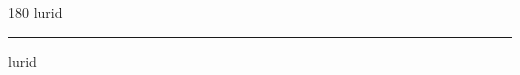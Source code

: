 
\begin{frame}
\begin{center}
\begin{turn}{180}
{\fontsize{2.5cm}{1em}\selectfont lurid}
\end{turn}
\vspace{1em}\par  
\hrule
\vspace{1em}\par  
{\fontsize{2.5cm}{1em}\selectfont lurid}
\end{center}
\end{frame}
